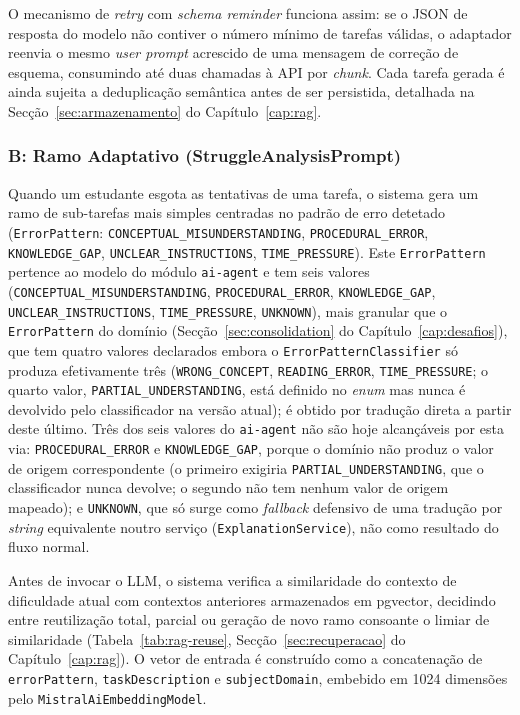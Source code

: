 O mecanismo de \textit{retry} com \textit{schema reminder} funciona assim: se o JSON de resposta do modelo não contiver o número mínimo de tarefas válidas, o adaptador reenvia o mesmo \textit{user prompt} acrescido de uma mensagem de correção de esquema, consumindo até duas chamadas à API por \textit{chunk}.
Cada tarefa gerada é ainda sujeita a deduplicação semântica antes de ser persistida, detalhada na Secção~\ref{sec:armazenamento} do Capítulo~\ref{cap:rag}.

\subsubsection*{B: Ramo Adaptativo (StruggleAnalysisPrompt)}

Quando um estudante esgota as tentativas de uma tarefa, o sistema gera um ramo de sub-tarefas mais simples centradas no padrão de erro detetado (\texttt{ErrorPattern}: \texttt{CONCEPTUAL\allowbreak\_MISUNDERSTANDING}, \texttt{PROCEDURAL\_ERROR}, \texttt{KNOWLEDGE\_GAP}, \texttt{UNCLEAR\_INSTRUCTIONS}, \texttt{TIME\_PRESSURE}).
Este \texttt{ErrorPattern} pertence ao modelo do módulo \texttt{ai-agent} e tem seis valores (\texttt{CONCEPTUAL\allowbreak\_MISUNDERSTANDING}, \texttt{PROCEDURAL\_ERROR}, \texttt{KNOWLEDGE\_GAP}, \texttt{UNCLEAR\_INSTRUCTIONS}, \texttt{TIME\_PRESSURE}, \texttt{UNKNOWN}), mais granular que o \texttt{ErrorPattern} do domínio (Secção~\ref{sec:consolidation} do Capítulo~\ref{cap:desafios}), que tem quatro valores declarados embora o \texttt{ErrorPatternClassifier} só produza efetivamente três (\texttt{WRONG\_CONCEPT}, \texttt{READING\_ERROR}, \texttt{TIME\_PRESSURE}; o quarto valor, \texttt{PARTIAL\_UNDERSTANDING}, está definido no \textit{enum} mas nunca é devolvido pelo classificador na versão atual); é obtido por tradução direta a partir deste último.
Três dos seis valores do \texttt{ai-agent} não são hoje alcançáveis por esta via: \texttt{PROCEDURAL\_ERROR} e \texttt{KNOWLEDGE\_GAP}, porque o domínio não produz o valor de origem correspondente (o primeiro exigiria \texttt{PARTIAL\_UNDERSTANDING}, que o classificador nunca devolve; o segundo não tem nenhum valor de origem mapeado); e \texttt{UNKNOWN}, que só surge como \textit{fallback} defensivo de uma tradução por \textit{string} equivalente noutro serviço (\texttt{ExplanationService}), não como resultado do fluxo normal.

Antes de invocar o LLM, o sistema verifica a similaridade do contexto de dificuldade atual com contextos anteriores armazenados em pgvector, decidindo entre reutilização total, parcial ou geração de novo ramo consoante o limiar de similaridade (Tabela~\ref{tab:rag-reuse}, Secção~\ref{sec:recuperacao} do Capítulo~\ref{cap:rag}).
O vetor de entrada é construído como a concatenação de \texttt{errorPattern}, \texttt{taskDescription} e \texttt{subjectDomain}, embebido em 1024 dimensões pelo \texttt{MistralAiEmbeddingModel}.

